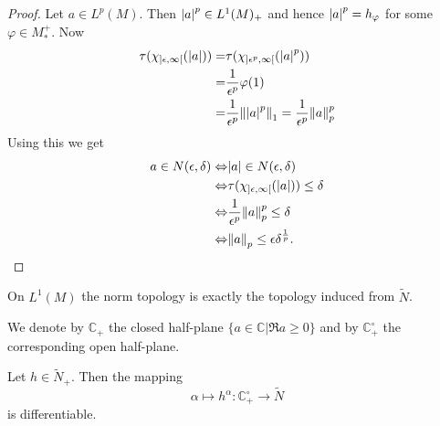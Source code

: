 \begin{proof}
    Let $a\in L^p(M)$. Then $\abs{a}^p\in L^1(M)_+$ and hence $\abs{a}^p=h_\varphi$ for some $\varphi\in M_*^+$. Now
    \[
        \begin{split}
            \tau(\chi_{]\epsilon,\infty[}(\abs{a}))=&\tau(\chi_{]\epsilon^p,\infty[}(\abs{a}^p))\\
            =&\frac{1}{\epsilon^p}\varphi(1)\\
            =&\frac{1}{\epsilon^p}\norm{\abs{a}^p}_1=\frac{1}{\epsilon^p}\norm{a}_p^p
        \end{split}
    \]
    Using this we get
    \[
        \begin{split}
            a\in N(\epsilon,\delta)\Leftrightarrow& \abs{a}\in N(\epsilon,\delta)\\
            \Leftrightarrow& \tau(\chi_{]\epsilon,\infty[}(\abs{a}))\leq \delta\\
            \Leftrightarrow& \frac{1}{\epsilon^p}\norm{a}_p^p\leq \delta\\
            \Leftrightarrow& \norm{a}_p\leq \epsilon\delta^\frac{1}{p}.
        \end{split}
    \]
\end{proof}
\begin{corollary}\label{Chap2: Coro: 17}
    On $L^1(M)$ the norm topology is exactly the topology induced from $\tilde{N}$.
\end{corollary}
We denote by $\mathbb{C}_+$ the closed half-plane $\{a\in \mathbb{C}|\Re a\geq 0\}$ and by $\mathbb{C}^{\circ}_+$ the corresponding open half-plane.
\begin{lemma}
    Let $h\in \tilde{N}_+$. Then the mapping
    \[
        \alpha\mapsto h^\alpha:\mathbb{C}_+^\circ\to \tilde{N}
    \]
    is differentiable.
\end{lemma}
